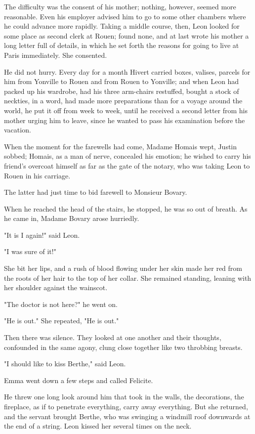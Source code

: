 \documentclass[11pt,twocolumn]{ltugboat}
\begin{document}
The difficulty was the consent of his mother; nothing, however, seemed
more reasonable. Even his employer advised him to go to some other
chambers where he could advance more rapidly. Taking a middle course,
then, Leon looked for some place as second clerk at Rouen; found none,
and at last wrote his mother a long letter full of details, in which
he set forth the reasons for going to live at Paris immediately. She
consented.

He did not hurry. Every day for a month Hivert carried boxes, valises,
parcels for him from Yonville to Rouen and from Rouen to Yonville;
and when Leon had packed up his wardrobe, had his three arm-chairs
restuffed, bought a stock of neckties, in a word, had made more
preparations than for a voyage around the world, he put it off from week
to week, until he received a second letter from his mother urging him to
leave, since he wanted to pass his examination before the vacation.

When the moment for the farewells had come, Madame Homais wept, Justin
sobbed; Homais, as a man of nerve, concealed his emotion; he wished to
carry his friend's overcoat himself as far as the gate of the notary,
who was taking Leon to Rouen in his carriage.

The latter had just time to bid farewell to Monsieur Bovary.

When he reached the head of the stairs, he stopped, he was so out of
breath. As he came in, Madame Bovary arose hurriedly.

"It is I again!" said Leon.

"I was sure of it!"

She bit her lips, and a rush of blood flowing under her skin made her
red from the roots of her hair to the top of her collar. She remained
standing, leaning with her shoulder against the wainscot.

"The doctor is not here?" he went on.

"He is out." She repeated, "He is out."

Then there was silence. They looked at one another and their thoughts,
confounded in the same agony, clung close together like two throbbing
breasts.

"I should like to kiss Berthe," said Leon.

Emma went down a few steps and called Felicite.

He threw one long look around him that took in the walls, the
decorations, the fireplace, as if to penetrate everything, carry away
everything. But she returned, and the servant brought Berthe, who was
swinging a windmill roof downwards at the end of a string. Leon kissed
her several times on the neck.
\end{document}
